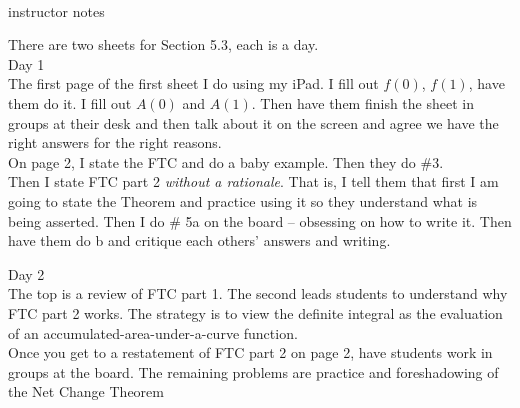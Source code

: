 \documentclass[11pt,fleqn]{article}
\begin{document}
\vspace*{-0.7in}

\begin{center}
  \Large{}\\
  instructor notes
  \end{center}
There are two sheets for Section 5.3, each is a day.\\

Day 1 \\

The first page of the first sheet I do using my iPad. I fill out $f(0)$, $f(1)$, have them do it. I fill out $A(0)$ and $A(1)$. Then have them finish the sheet in groups at their desk and then talk about it on the screen and agree we have the right answers for the right reasons.\\

On page 2, I state the FTC and do a baby example. Then they do \#3. \\

Then I state FTC part 2 \emph{without a rationale}. That is, I tell them that first I am going to state the Theorem and practice using it so they understand what is being asserted.  Then I do \# 5a on the board -- obsessing on how to write it. Then have them do b and critique each others' answers and writing.

Day 2\\

The top is a review of FTC part 1. The second leads students to understand why FTC part 2 works. The strategy is to view the definite integral as the evaluation of an accumulated-area-under-a-curve function.\\

Once you get to a restatement of FTC part 2 on page 2, have students work in groups at the board. The remaining problems are practice and foreshadowing of the Net Change Theorem
\end{document}
